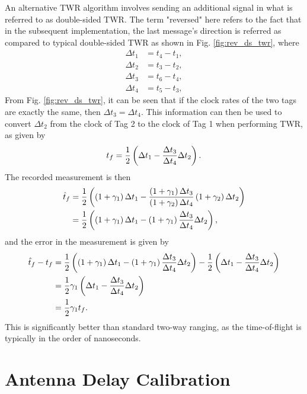 \documentclass{decar-wsd}    %
\begin{document}
An alternative TWR algorithm involves sending an additional signal in what is referred to as double-sided TWR. The term "reversed" here refers to the fact that in the subsequent implementation, the last message's direction is referred as compared to typical double-sided TWR as shown in Fig. \ref{fig:rev_ds_twr}, where
\begin{align}
    \Delta t_1 &= t_4 - t_1, \\
    \Delta t_2 &= t_3 - t_2, \\
    \Delta t_3 &= t_6 - t_4, \\
    \Delta t_4 &= t_5 - t_3,
\end{align}
From Fig. \ref{fig:rev_ds_twr}, it can be seen that if the clock rates of the two tags are exactly the same, then $\Delta t_3 = \Delta t_4$. This information can then be used to convert $\Delta t_2$ from the clock of Tag 2 to the clock of Tag 1 when performing TWR, as given by
\begin{align}
    t_f = \frac{1}{2} \left( \Delta t_1 - \frac{\Delta t_3}{\Delta t_4} \Delta t_2 \right).
\end{align}
The recorded measurement is then
\begin{align}
    \hat{t}_f &= \frac{1}{2} \left( \left(1 + \gamma_1 \right) \Delta t_1 - \frac{\left(1 + \gamma_1 \right) \Delta t_3}{\left(1 + \gamma_2 \right) \Delta t_4} \left( 1 + \gamma_2 \right) \Delta t_2 \right) \\
    &= \frac{1}{2} \left( \left(1 + \gamma_1 \right) \Delta t_1 - \left(1 + \gamma_1 \right) \frac{\Delta t_3}{\Delta t_4} \Delta t_2 \right),
\end{align}
and the error in the measurement is given by
\begin{align}
    \hat{t}_f - t_f &= \frac{1}{2} \left( \left(1 + \gamma_1 \right) \Delta t_1 - \left(1 + \gamma_1 \right) \frac{\Delta t_3}{\Delta t_4} \Delta t_2 \right) - \frac{1}{2} \left( \Delta t_1 - \frac{\Delta t_3}{\Delta t_4} \Delta t_2 \right) \\
    &= \frac{1}{2} \gamma_1 \left( \Delta t_1 - \frac{\Delta t_3}{\Delta t_4} \Delta t_2 \right) \\
    &= \frac{1}{2} \gamma_1 t_f.
\end{align}
This is significantly better than standard two-way ranging, as the time-of-flight is typically in the order of nanoseconds.

\section{Antenna Delay Calibration}
\end{document}
